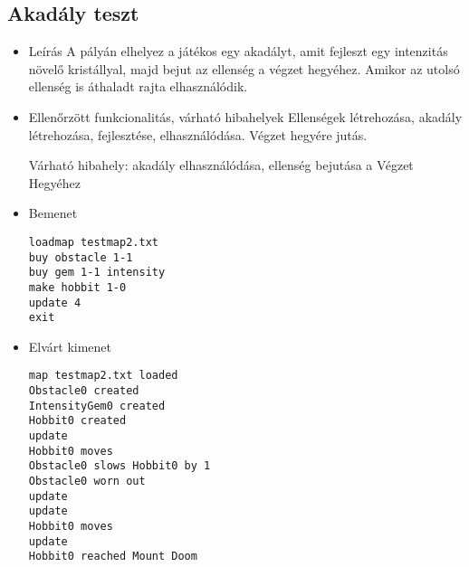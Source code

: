 \subsection{Akadály teszt}
\begin{itemize}
\item Leírás\newline
A pályán elhelyez a játékos egy akadályt, amit fejleszt egy intenzitás növelő kristállyal, majd bejut az ellenség a végzet hegyéhez. Amikor az utolsó ellenség is áthaladt rajta elhasználódik.
\item Ellenőrzött funkcionalitás, várható hibahelyek\newline
Ellenségek létrehozása, akadály létrehozása, fejlesztése, elhasználódása. Végzet hegyére jutás.

Várható hibahely: akadály elhasználódása, ellenség bejutása a Végzet Hegyéhez
\item Bemenet\newline
\begin{verbatim}
loadmap testmap2.txt
buy obstacle 1-1
buy gem 1-1 intensity
make hobbit 1-0
update 4 
exit
\end{verbatim}
\item Elvárt kimenet\newline
\begin{verbatim}
map testmap2.txt loaded
Obstacle0 created
IntensityGem0 created
Hobbit0 created
update
Hobbit0 moves
Obstacle0 slows Hobbit0 by 1
Obstacle0 worn out
update
update
Hobbit0 moves
update 
Hobbit0 reached Mount Doom
\end{verbatim}
\end{itemize}

